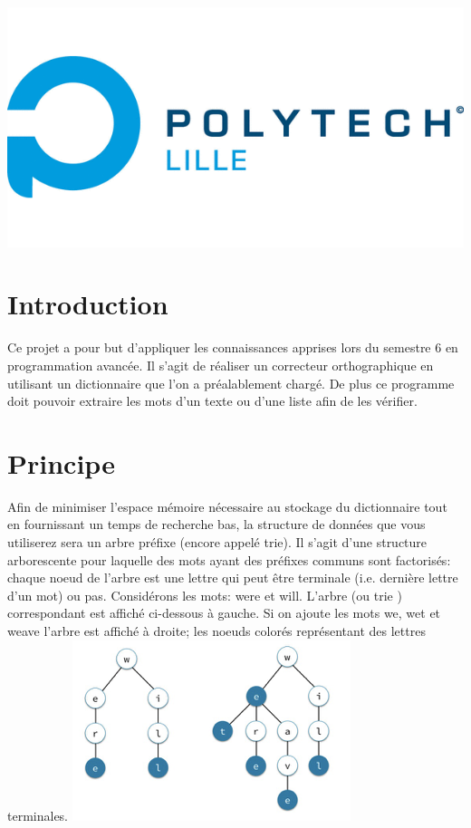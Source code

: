 \documentclass[12pt]{article}
\begin{document}
\begin{titlepage}
\includegraphics[scale=0.4]{logo.png} %
 
 
\vfill %

\end{titlepage}
\section{Introduction}
	

Ce projet a pour but d'appliquer les connaissances apprises lors du semestre 6 en programmation avancée. Il s'agit de réaliser un correcteur orthographique en utilisant un dictionnaire que l'on a préalablement chargé. De plus ce programme doit pouvoir extraire les mots d'un texte ou d'une liste afin de les vérifier.
\newline

\section{Principe}
Afin de minimiser l’espace mémoire nécessaire au stockage du dictionnaire tout en fournissant un temps de recherche bas, la structure de données que vous utiliserez sera un arbre préfixe (encore appelé trie). Il s’agit d’une structure arborescente pour laquelle des mots ayant des préfixes communs sont factorisés: chaque noeud de l’arbre est une lettre qui peut être terminale (i.e. dernière lettre d’un mot) ou pas.
\newline
\noindent
Considérons les mots: were et will. L’arbre (ou trie ) correspondant est affiché ci-dessous à gauche. Si on ajoute les mots we, wet et weave l’arbre est affiché à droite; les noeuds colorés représentant des lettres terminales.
\includegraphics[scale=1.2]{arbre.png}
\newpage
\end{document}
